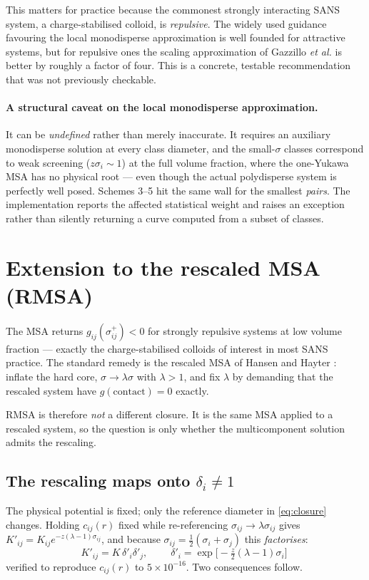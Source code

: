 \documentclass[11pt,a4paper]{article}
\begin{document}
This matters for practice because the commonest strongly interacting SANS
system, a charge-stabilised colloid, is \emph{repulsive}. The widely used
guidance favouring the local monodisperse approximation is well founded for
attractive systems, but for repulsive ones the scaling approximation of
Gazzillo \emph{et al.} is better by roughly a factor of four. This is a
concrete, testable recommendation that was not previously checkable.

\paragraph{A structural caveat on the local monodisperse approximation.} It can
be \emph{undefined} rather than merely inaccurate. It requires an auxiliary
monodisperse solution at every class diameter, and the small-$\sigma$ classes
correspond to weak screening ($z\sigma_i\sim1$) at the full volume fraction,
where the one-Yukawa MSA has no physical root --- even though the actual
polydisperse system is perfectly well posed. Schemes 3--5 hit the same wall for
the smallest \emph{pairs}. The implementation reports the affected statistical
weight and raises an exception rather than silently returning a curve computed
from a subset of classes.


\section{Extension to the rescaled MSA (RMSA)}
\label{sec:rmsa}

The MSA returns $g_{ij}(\sigma^+_{ij})<0$ for strongly repulsive systems at low
volume fraction --- exactly the charge-stabilised colloids of interest in most
SANS practice. The standard remedy is the rescaled MSA of Hansen and Hayter
\cite{HansenHayter1982}: inflate the hard core, $\sigma\to\lambda\sigma$ with
$\lambda>1$, and fix $\lambda$ by demanding that the rescaled system have
$g(\text{contact})=0$ exactly.

RMSA is therefore \emph{not} a different closure. It is the same MSA applied to
a rescaled system, so the question is only whether the multicomponent solution
admits the rescaling.

\subsection{The rescaling maps onto $\delta_i\neq1$}

The physical potential is fixed; only the reference diameter in
\eqref{eq:closure} changes. Holding $c_{ij}(r)$ fixed while re-referencing
$\sigma_{ij}\to\lambda\sigma_{ij}$ gives
$K'_{ij}=K_{ij}e^{-z(\lambda-1)\sigma_{ij}}$, and because
$\sigma_{ij}=\tfrac12(\sigma_i+\sigma_j)$ this \emph{factorises}:
\begin{equation}
  K'_{ij}=K\,\delta'_i\delta'_j,\qquad
  \boxed{\;\delta'_i=\exp\!\big[-\tfrac{z}{2}(\lambda-1)\sigma_i\big]\;}
  \label{eq:rmsadelta}
\end{equation}
verified to reproduce $c_{ij}(r)$ to $5\times10^{-16}$. Two consequences follow.
\end{document}
